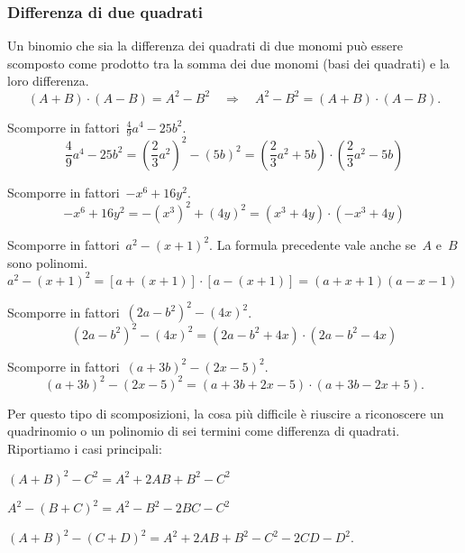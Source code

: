 \subsubsection{Differenza di due quadrati}
\label{subsubsec:divpol_difquad}

Un binomio che sia la differenza dei quadrati di due monomi può essere 
scomposto come prodotto tra la somma dei due monomi (basi dei quadrati) e 
la loro differenza.
\begin{equation*}
(A+B)\cdot (A-B)=
A^{2}-B^{2}\quad \Rightarrow \quad A^{2}-B^{2}=(A+B)\cdot (A-B).
\end{equation*}

 \begin{esempio}
Scomporre in fattori~$\frac{4}{9}a^{4}-25b^{2}$.
\[\frac{4}{9}a^{4}-25b^{2}=
  \left(\frac{2}{3}a^{2}\right)^{2}-\left(5b\right)^{2}=
  \left(\frac{2}{3}a^{2}+5b\right)\cdot \left(\frac{2}{3}a^{{2}}-5b\right)\]
 \end{esempio}

 \begin{esempio}
Scomporre in fattori~$-x^{6}+16y^{2}$.
\[-x^{6}+16y^{2}=-\left(x^{3}\right)^{2}+\left(4y\right)^{2}=
  \left(x^{3}+4y\right)\cdot \left(-x^{3}+4y\right)\]
 \end{esempio}

 \begin{esempio}
Scomporre in fattori~$a^{2}-\left(x+1\right)^{2}$.
La formula precedente vale anche se~$A$ e~$B$ sono polinomi. 
$a^{2}-\left(x+1\right)^{2}=
 \left[a+(x+1)\right]\cdot \left[a-(x+1)\right]=(a+x+1)(a-x-1)$
\end{esempio}

 \begin{esempio}
Scomporre in fattori~$\left(2a-b^{2}\right)^{2}-(4x)^{2}$.
\[\left(2a-b^{2}\right)^{2}-(4x)^{2}=
\left(2a-b^{2}+4x\right)\cdot \left(2a-b^{2}-4x\right)\]
 \end{esempio}

 \begin{esempio}
Scomporre in fattori~$(a+3b)^{2}-(2x-5)^{2}$.
\[(a+3b)^{2}-(2x-5)^{2}=(a+3b+2x-5)\cdot (a+3b-2x+5).\]
 \end{esempio}

Per questo tipo di scomposizioni, la cosa più difficile è riuscire a 
riconoscere un quadrinomio o un polinomio di sei termini come differenza 
di quadrati. Riportiamo i casi principali:
\begin{itemize*}
 \item $(A+B)^{2}-C^{2}=A^{{2}}+2AB+B^{2}-C^{2}$
 \item $A^{2}-(B+C)^{2}=A^{2}-B^{2}-2BC-C^{2}$
 \item $(A+B)^{2}-(C+D)^{2}=A^{2}+2AB+B^{2}-C^{2}-2CD-D^{2}$.
\end{itemize*}

